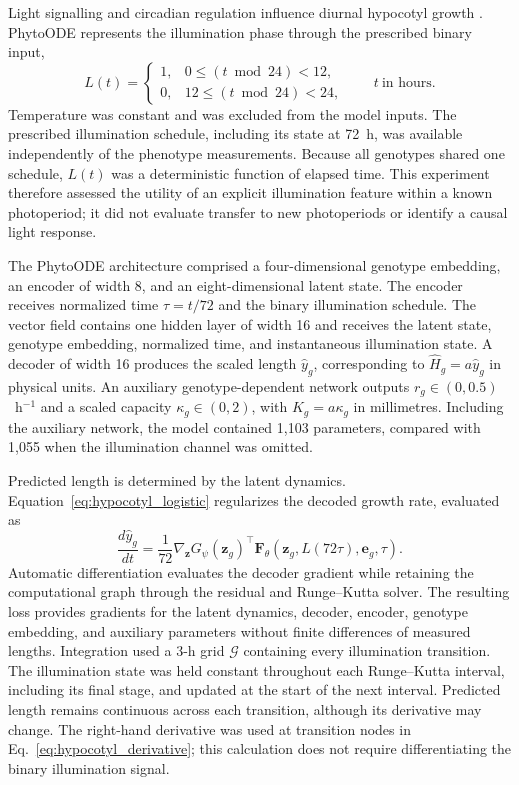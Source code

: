 \documentclass[preprint,12pt,authoryear]{elsarticle}
\begin{document}
Light signalling and circadian regulation influence diurnal hypocotyl growth \citep{nozue2007rhythmic}. PhytoODE represents the illumination phase through the prescribed binary input,
\begin{equation}
 L(t)=
 \begin{cases}
  1,&0\leq (t\bmod 24)<12,\\
  0,&12\leq (t\bmod 24)<24,
 \end{cases}
 \qquad t\ \text{in hours}.
 \label{eq:hypocotyl_light}
\end{equation}
Temperature was constant and was excluded from the model inputs. The prescribed illumination schedule, including its state at 72~h, was available independently of the phenotype measurements. Because all genotypes shared one schedule, $L(t)$ was a deterministic function of elapsed time. This experiment therefore assessed the utility of an explicit illumination feature within a known photoperiod; it did not evaluate transfer to new photoperiods or identify a causal light response.

The PhytoODE architecture comprised a four-dimensional genotype embedding, an encoder of width 8, and an eight-dimensional latent state. The encoder receives normalized time $\tau=t/72$ and the binary illumination schedule. The vector field contains one hidden layer of width 16 and receives the latent state, genotype embedding, normalized time, and instantaneous illumination state. A decoder of width 16 produces the scaled length $\hat y_g$, corresponding to $\hat H_g=a\hat y_g$ in physical units. An auxiliary genotype-dependent network outputs $r_g\in(0,0.5)$~h$^{-1}$ and a scaled capacity $\kappa_g\in(0,2)$, with $K_g=a\kappa_g$ in millimetres. Including the auxiliary network, the model contained 1,103 parameters, compared with 1,055 when the illumination channel was omitted.

Predicted length is determined by the latent dynamics. Equation~\eqref{eq:hypocotyl_logistic} regularizes the decoded growth rate, evaluated as
\begin{equation}
 \frac{d\hat y_g}{dt}
 =\frac{1}{72}\nabla_{\mathbf z}G_\psi(\mathbf z_g)^{\top}
 \mathbf F_\theta(\mathbf z_g,L(72\tau),\mathbf e_g,\tau).
 \label{eq:hypocotyl_derivative}
\end{equation}
Automatic differentiation evaluates the decoder gradient while retaining the computational graph through the residual and Runge--Kutta solver. The resulting loss provides gradients for the latent dynamics, decoder, encoder, genotype embedding, and auxiliary parameters without finite differences of measured lengths. Integration used a 3-h grid $\mathcal G$ containing every illumination transition. The illumination state was held constant throughout each Runge--Kutta interval, including its final stage, and updated at the start of the next interval. Predicted length remains continuous across each transition, although its derivative may change. The right-hand derivative was used at transition nodes in Eq.~\eqref{eq:hypocotyl_derivative}; this calculation does not require differentiating the binary illumination signal.
\end{document}
